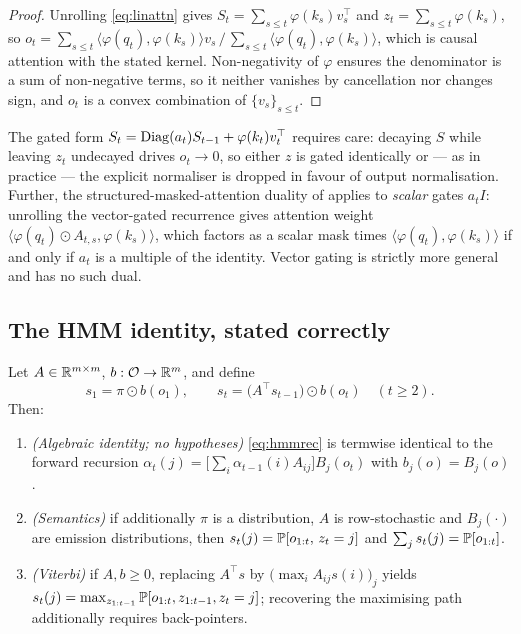 \begin{proof}
Unrolling \eqref{eq:linattn} gives $S_t = \sum_{s\le t}\varphi(k_s)v_s^\top$ and
$z_t = \sum_{s \le t}\varphi(k_s)$, so
$o_t = \sum_{s\le t} \langle \varphi(q_t),\varphi(k_s)\rangle v_s \,/\,
       \sum_{s\le t} \langle \varphi(q_t),\varphi(k_s)\rangle$,
which is causal attention with the stated kernel. Non-negativity of $\varphi$
ensures the denominator is a sum of non-negative terms, so it neither vanishes
by cancellation nor changes sign, and $o_t$ is a convex combination of
$\{v_s\}_{s \le t}$.
\end{proof}

\begin{remark}
\label{rem:gating}
The gated form $S_t = \mathrm{Diag}(a_t)S_{t-1} + \varphi(k_t)v_t^\top$ requires care:
decaying $S$ while leaving $z_t$ undecayed drives $o_t \to 0$, so either $z$ is
gated identically or --- as in practice --- the explicit normaliser is dropped in
favour of output normalisation. Further, the structured-masked-attention duality
of \cite{dao2024mamba2} applies to \emph{scalar} gates $a_t I$: unrolling the
vector-gated recurrence gives attention weight
$\langle \varphi(q_t) \odot A_{t,s}, \varphi(k_s)\rangle$, which factors as a
scalar mask times $\langle\varphi(q_t),\varphi(k_s)\rangle$ if and only if $a_t$
is a multiple of the identity. Vector gating is strictly more general and has no
such dual.
\end{remark}

\subsection{The HMM identity, stated correctly}
\label{sec:state-hmm}

\begin{theorem}
\label{thm:hmm}
Let $A \in \mathbb{R}^{m\times m}$, $b : \mathcal{O} \to \mathbb{R}^{m}$, and define
\begin{equation}
  s_1 = \pi \odot b(o_1), \qquad
  s_t = \big(A^{\top} s_{t-1}\big) \odot b(o_t) \quad (t \ge 2).
  \label{eq:hmmrec}
\end{equation}
Then:
\begin{enumerate}
  \item[(i)] \emph{(Algebraic identity; no hypotheses)} \eqref{eq:hmmrec} is
        termwise identical to the forward recursion
        $\alpha_t(j) = \big[\sum_i \alpha_{t-1}(i)A_{ij}\big]B_j(o_t)$ with
        $b_j(o) = B_j(o)$.
  \item[(ii)] \emph{(Semantics)} if additionally $\pi$ is a distribution, $A$ is
        row-stochastic and $B_j(\cdot)$ are emission distributions, then
        $s_t(j) = \mathbb{P}\!\left[o_{1:t},\, z_t = j\right]$ and
        $\sum_j s_t(j) = \mathbb{P}[o_{1:t}]$.
  \item[(iii)] \emph{(Viterbi)} if $A, b \ge 0$, replacing $A^\top s$ by
        $\big(\max_i A_{ij}s(i)\big)_j$ yields
        $s_t(j) = \max_{z_{1:t-1}} \mathbb{P}[o_{1:t}, z_{1:t-1}, z_t = j]$; recovering
        the maximising path additionally requires back-pointers.
\end{enumerate}
\end{theorem}

